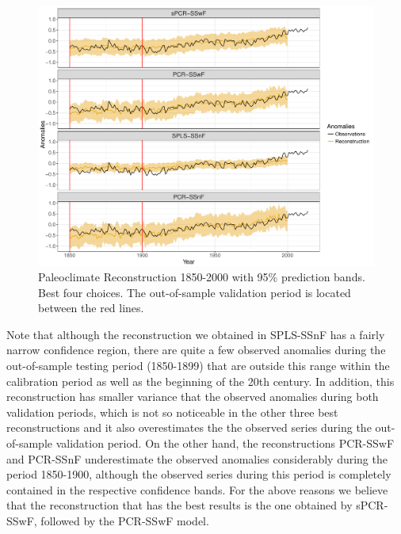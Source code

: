 \documentclass[11pt]{amsart}
\theoremstyle{plain}
\theoremstyle{definition}
\theoremstyle{remark}
\begin{document}
\begin{figure}
  \centering
  \includegraphics[scale=0.55]{Rec1900_Final}
  \caption{Paleoclimate Reconstruction 1850-2000 with 95\%
    prediction bands. Best four choices. The out-of-sample validation period is
    located between the red lines.}
  \label{fig:paleo19001}
\end{figure}
Note that although the reconstruction we obtained in
SPLS-SSnF has a fairly narrow confidence region, there are quite a few observed
anomalies during the out-of-sample testing period (1850-1899) that are outside
this range within the calibration period as well as the beginning of the 20th
century. In addition, this reconstruction has smaller variance that the observed
anomalies during both validation periods, which is not so noticeable in the other
three best reconstructions and  it also overestimates the the observed series
during the out-of-sample validation period. On the other hand, the reconstructions PCR-SSwF and PCR-SSnF  
underestimate the observed anomalies considerably during the period 1850-1900,
although the observed series during this period is completely contained in the
respective confidence bands. For the above reasons we believe that the
reconstruction that has the best results is the one obtained by sPCR-SSwF, followed
by the PCR-SSwF model. 
\end{document}
